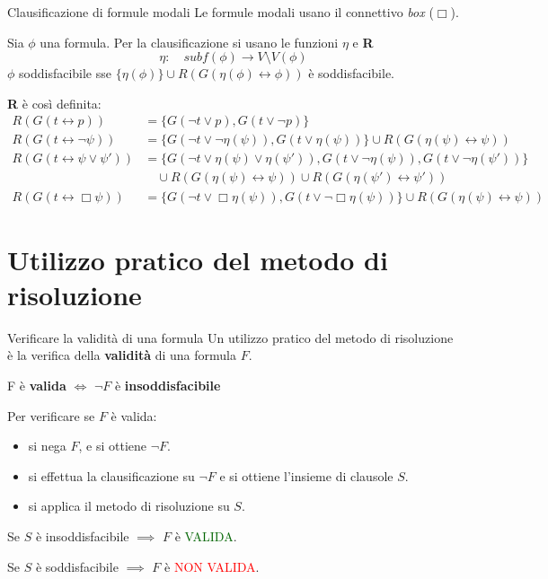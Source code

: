 \documentclass{beamer}
\newcommand{\tto} {\leftrightarrow}
\begin{document}
\begin{frame}{Clausificazione di formule modali}
    Le formule modali usano il connettivo \emph{box} ($\Box$).

    Sia $\phi$ una formula. Per la clausificazione si usano le funzioni $\eta$ e \textbf{R}
    \[
        \eta: \quad subf(\phi) \to V \setminus V(\phi)
    \]
    $\phi$ soddisfacibile sse $\{ \eta(\phi) \} \cup R(G(\eta(\phi) \tto \phi))$ è soddisfacibile.

    \textbf{R} è così definita:
    \[
        \begin{aligned}
        R(G(t \tto p)) &= \{ G(\lnot t \lor p), G(t \lor \lnot p) \} \\
        R(G(t \tto \lnot \psi)) &= \{ G(\lnot t \lor \lnot \eta(\psi)), G(t \lor \eta(\psi)) \} \cup R(G(\eta(\psi) \tto \psi)) \\
        R(G(t \tto \psi \lor \psi')) &= \{ G(\lnot t \lor \eta(\psi) \lor \eta(\psi')), G(t \lor \lnot \eta(\psi)), G(t \lor \lnot \eta(\psi')) \} \\
        & \quad \cup R(G(\eta(\psi) \tto \psi)) \cup R(G(\eta(\psi') \tto \psi')) \\
        R(G(t \tto \Box \psi)) &= \{ G(\lnot t \lor \Box \eta(\psi)), G(t \lor \lnot \Box \eta(\psi)) \} \cup R(G(\eta(\psi) \tto \psi))
        \end{aligned}
    \]
\end{frame}

\section{Utilizzo pratico del metodo di risoluzione}

\begin{frame}{Verificare la validità di una formula}
    Un utilizzo pratico del metodo di risoluzione è la verifica della \textbf{validità} di una formula $F$.
    \begin{center}
        F è \textbf{valida} $\iff$ $\lnot F$ è \textbf{insoddisfacibile}
    \end{center}
    
    Per verificare se $F$ è valida:
    \begin{itemize}
        \item si nega $F$, e si ottiene $\lnot F$.
        \item si effettua la clausificazione su $\lnot F$ e si ottiene l'insieme di clausole $S$.
        \item si applica il metodo di risoluzione su $S$.
    \end{itemize}

    Se $S$ è insoddisfacibile $\implies$ $F$ è \textcolor{darkgreen}{VALIDA}.

    Se $S$ è soddisfacibile $\implies$ $F$ è \textcolor{red}{NON VALIDA}.
\end{frame}
\end{document}
